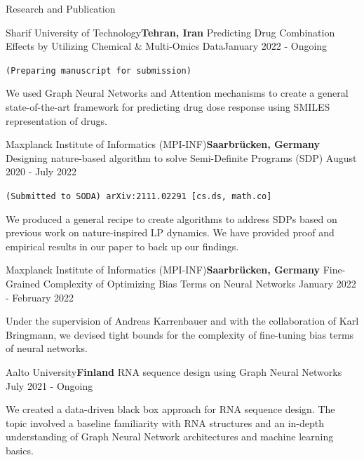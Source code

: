 \documentclass{resume} %
\begin{document}
\begin{rSection}{Research and Publication}


\begin{rSubsection}{Sharif University of Technology}{\textcolor{Black!70}{\bf Tehran, Iran}}
{Predicting Drug Combination Effects by Utilizing Chemical \& Multi-Omics Data}{\textcolor{Black!70}{January 2022 - Ongoing}}
\item {\tt (Preparing manuscript for submission)}
\begin{small}
\item We used Graph Neural Networks and Attention mechanisms to create a general state-of-the-art framework for predicting drug dose response using SMILES representation of drugs.
\end{small}
\end{rSubsection}


\begin{rSubsection}{Maxplanck Institute of Informatics (MPI-INF)}{\textcolor{Black!70}{\bf Saarbrücken, Germany}}
{Designing nature-based algorithm to solve Semi-Definite Programs (SDP)}
{\textcolor{Black!70}{August 2020 - July 2022}}
\item {\tt(Submitted to SODA) arXiv:2111.02291 [cs.ds, math.co]} \begin{small}
\item We produced a general recipe to create algorithms to address SDPs based on previous work on nature-inspired LP dynamics. We have provided proof and empirical results in our paper to back up our findings.
\end{small}
\end{rSubsection}
\begin{rSubsection}{Maxplanck Institute of Informatics (MPI-INF)}{\textcolor{Black!70}{\bf Saarbrücken, Germany}}
{Fine-Grained Complexity of Optimizing Bias Terms on Neural Networks}
{\textcolor{Black!70}{January 2022 - February 2022}}
\begin{small}
\item Under the supervision of Andreas Karrenbauer and with the collaboration of Karl Bringmann, we devised tight bounds for the complexity of fine-tuning bias terms of neural networks.
\end{small}
\end{rSubsection}

\begin{rSubsection}{Aalto University}{\textcolor{Black!70}{\bf Finland}}
{RNA sequence design using Graph Neural Networks}
{\textcolor{Black!70}{July 2021 - Ongoing}}{}
\begin{small}
\item We created a data-driven black box approach for RNA sequence design. The topic involved a baseline familiarity with RNA structures and an in-depth understanding of Graph Neural Network architectures and machine learning basics.
\end{small}
\end{rSubsection}

\end{rSection}
\end{document}
